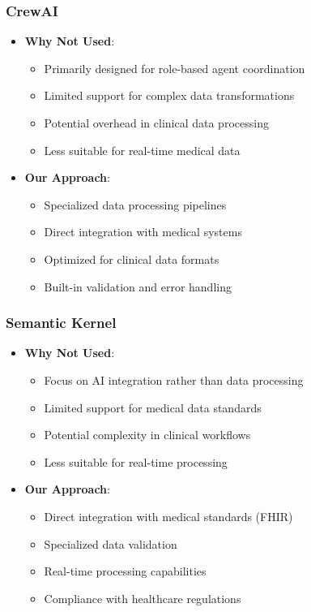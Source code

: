 \documentclass[12pt]{article}
\begin{document}
\subsubsection{CrewAI}
\begin{itemize}
    \item \textbf{Why Not Used}:
    \begin{itemize}
        \item Primarily designed for role-based agent coordination
        \item Limited support for complex data transformations
        \item Potential overhead in clinical data processing
        \item Less suitable for real-time medical data
    \end{itemize}
    \item \textbf{Our Approach}:
    \begin{itemize}
        \item Specialized data processing pipelines
        \item Direct integration with medical systems
        \item Optimized for clinical data formats
        \item Built-in validation and error handling
    \end{itemize}
\end{itemize}

\subsubsection{Semantic Kernel}
\begin{itemize}
    \item \textbf{Why Not Used}:
    \begin{itemize}
        \item Focus on AI integration rather than data processing
        \item Limited support for medical data standards
        \item Potential complexity in clinical workflows
        \item Less suitable for real-time processing
    \end{itemize}
    \item \textbf{Our Approach}:
    \begin{itemize}
        \item Direct integration with medical standards (FHIR)
        \item Specialized data validation
        \item Real-time processing capabilities
        \item Compliance with healthcare regulations
    \end{itemize}
\end{itemize}
\end{document}
